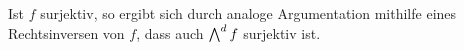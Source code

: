 Ist $f$ surjektiv, so ergibt sich durch analoge Argumentation mithilfe eines Rechtsinversen von $f$, dass auch $\bigwedge^{d} f$ surjektiv ist.





% 
% 
% 
% 
% 
% 
% 
% 
% 
% 
